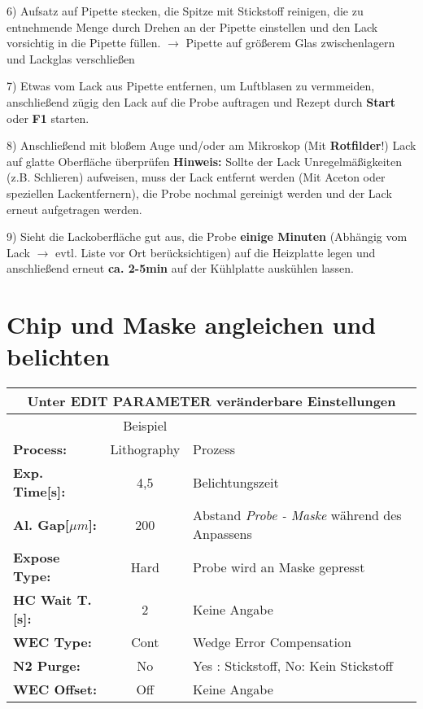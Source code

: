 \documentclass[12pt,a4paper]{article}
\begin{document}
\begin{description}
\begin{description}
\end{description}

\item 6) Aufsatz auf Pipette stecken, die Spitze mit Stickstoff reinigen, die zu entnehmende Menge durch Drehen an der Pipette einstellen und den Lack vorsichtig in die Pipette füllen. $\rightarrow$ Pipette auf größerem Glas zwischenlagern und Lackglas verschließen

\item 7) Etwas vom Lack aus Pipette entfernen, um Luftblasen zu vermmeiden, anschließend zügig den Lack auf die Probe auftragen und Rezept durch \textbf{Start} oder \textbf{F1} starten.

\item 8) Anschließend mit bloßem Auge und/oder am Mikroskop (Mit \textbf{Rotfilder}!) Lack auf glatte Oberfläche überprüfen\newline
\textbf{Hinweis:} Sollte der Lack Unregelmäßigkeiten (z.B. Schlieren) aufweisen, muss der Lack entfernt werden (Mit Aceton oder speziellen Lackentfernern), die Probe nochmal gereinigt werden und der Lack erneut aufgetragen werden.

\item 9) Sieht die Lackoberfläche gut aus, die Probe \textbf{einige Minuten} (Abhängig vom Lack $\rightarrow$ evtl. Liste vor Ort berücksichtigen) auf die Heizplatte legen und anschließend erneut \textbf{ca. 2-5min} auf der Kühlplatte auskühlen lassen.

\end{description}

\newpage

\section{Chip und Maske angleichen und belichten}
\begin{center}
\begin{tabular}{| l | c | l |}
\multicolumn{3}{c}{Unter \textbf{EDIT PARAMETER} veränderbare Einstellungen}\\ \hline
& Beispiel & \\ \hline
\textbf{Process:}  & Lithography & Prozess\\ \hline
\textbf{Exp. Time[s]:} & 4,5 & Belichtungszeit\\ \hline
\textbf{Al. Gap[$\mu m$]:} & 200 & Abstand \textit{Probe - Maske} 
während des Anpassens\\ \hline
\textbf{Expose Type:} & Hard & Probe wird an Maske gepresst\\ \hline
\textbf{HC Wait T.[s]:} & 2 & Keine Angabe\\ \hline
\textbf{WEC Type:} & Cont & Wedge Error Compensation\\ \hline
\textbf{N2 Purge:} & No & Yes : Stickstoff, No: Kein Stickstoff\\ \hline
\textbf{WEC Offset:} & Off & Keine Angabe\\ \hline
\end{tabular}
\end{center}
\end{document}
